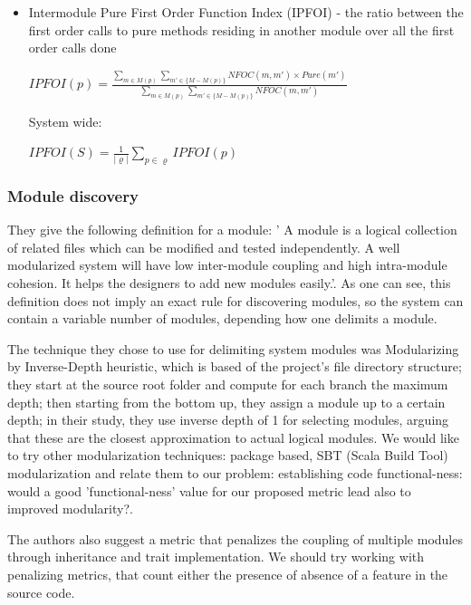 \documentclass{article}
\begin{document}
\begin{itemize}
\item Intermodule Pure First Order Function Index (IPFOI) - the ratio between the first order calls to pure methods residing in another module over all the first order calls done
\begin{center}
  $IPFOI(p) = \frac { \sum_{m \in M(p)} \sum_{m' \in \{M-M(p) \}} NFOC(m,m') \times Pure(m') } { \sum_{m \in M(p)} \sum_{m' \in \{M - M(p)\}} NFOC(m,m') } $ 
\end{center}

System wide:

\begin{center}
$IPFOI(S) = \frac 1 {|\varrho|} \sum_{ p \in \varrho } IPFOI(p)  $
\end{center}

\end{itemize}


\subsubsection{Module discovery}
They give the following definition for a module: ' A module is a logical collection of related files which can be modified and tested independently. A well modularized system will have low inter-module coupling and high intra-module cohesion. It helps the designers to add new modules easily.'\cite{DBLP:conf/icse/MudduABP13}. As one can see, this definition does not imply an exact rule for discovering  modules, so the system can contain a variable number of modules, depending how one delimits a module. \par
The technique they chose to use for delimiting system modules  was Modularizing by  Inverse-Depth heuristic, which is based of the project's file directory structure; they start at the source root folder and compute for each branch the maximum depth; then starting from the bottom up, they assign a module up to a certain depth; in their study, they use inverse depth of 1 for selecting modules, arguing that these are the closest approximation to actual logical modules. We would like to try other modularization techniques: package based, SBT (Scala Build Tool)  modularization and relate them to our problem: establishing code functional-ness: would a good 'functional-ness' value for our proposed metric lead also to improved modularity?.\par
The authors also suggest a metric that penalizes the coupling of multiple modules through inheritance and trait implementation. We should try working with penalizing metrics, that count either the presence of absence of a feature in the source code.
\end{document}

